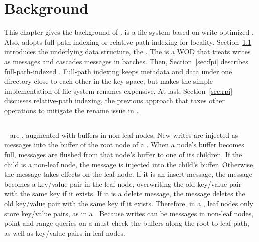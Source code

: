 \chapter{Background}
\label{chap:bg}

This chapter gives the background of \betrfs.
\betrfs is a file system based on write-optimized \bets.
Also, \betrfs adopts full-path indexing or relative-path indexing for locality.
Section~\ref{sec:bet} introduces the underlying data structure, the \bet.
The \bet is a WOD that treats writes as messages and cascades messages in
batches.
Then, Section~\ref{sec:fpi} describes full-path-indexed \betrfs.
Full-path indexing keeps metadata and data under one directory close to each
other in the key space,
but makes the simple implementation of file system renames expensive.
At last, Section~\ref{sec:rpi} discusses relative-path indexing,
the previous approach that taxes other operations to mitigate the rename issue
in \betrfs.

\section{\bets}
\label{sec:bet}

\bets~\citep{bet,betlogin} are \btrees, augmented with buffers in non-leaf
nodes.
New writes are injected as messages into the buffer of the root node of a \bet.
When a node's buffer becomes full, messages are flushed from that node's buffer
to one of its children.
If the child is a non-leaf node, the message is injected into the child's
buffer.
Otherwise, the message takes effects on the leaf node.
If it is an insert message,
the message becomes a key/value pair in the leaf node,
overwriting the old key/value pair with the same key if it exists.
If it is a delete message, the message deletes the old key/value pair with the
same key if it exists.
Therefore, in a \bets, leaf nodes only store key/value pairs, as in a \btree.
Because writes can be messages in non-leaf nodes, point and range queries on a
\bet must check the buffers along the root-to-leaf path,
as well as key/value pairs in leaf nodes.


